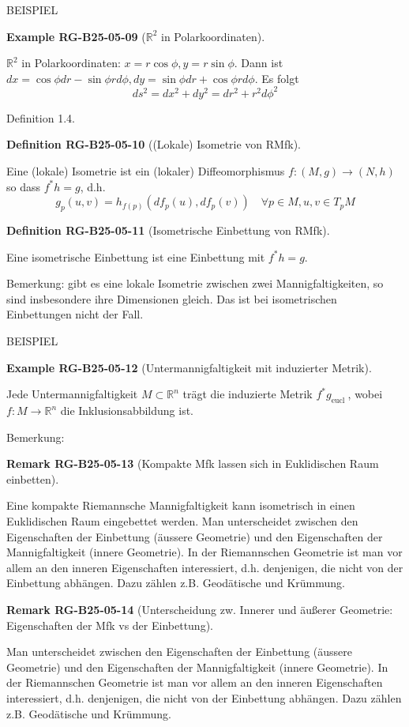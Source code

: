 \documentclass[10pt, letterpaper]{article}
\newcommand{\R}{\mathbb{R}}
\newcommand{\CustomHeading}[3]{%
  \par\medskip\noindent%
  \textbf{#1 #2} \textnormal{(#3)}.\enskip%
}
\newenvironment{DEF}[2]{\begin{unitbox}\CustomHeading{Definition}{#1}{#2}}{\end{unitbox}}
\newenvironment{REM}[2]{\begin{unitbox}\CustomHeading{Remark}{#1}{#2}}{\end{unitbox}}
\newenvironment{EXA}[2]{\begin{unitbox}\CustomHeading{Example}{#1}{#2}}{\end{unitbox}}
\begin{document}
BEISPIEL 


\begin{EXA}{RG-B25-05-09}{$\R^2$ in Polarkoordinaten}
$\mathbb{R}^{2}$ in Polarkoordinaten: $x=r \cos \phi, y=r \sin \phi$. Dann ist $d x=\cos \phi d r-\sin \phi r d \phi, d y=\sin \phi d r+\cos \phi r d \phi$. Es folgt
$$
d s^{2}=d x^{2}+d y^{2}=d r^{2}+r^{2} d \phi^{2}
$$
\end{EXA}

Definition 1.4. 



\begin{DEF}{RG-B25-05-10}{(Lokale) Isometrie von RMfk}
Eine (lokale) Isometrie ist ein (lokaler) Diffeomorphismus $f:(M, g) \rightarrow(N, h)$ so dass $f^{*} h=g$, d.h.
$$
g_{p}(u, v)=h_{f(p)}\left(d f_{p}(u), d f_{p}(v)\right) \quad \forall p \in M, u, v \in T_{p} M
$$
\end{DEF}

\begin{DEF}{RG-B25-05-11}{Isometrische Einbettung von RMfk}
Eine isometrische Einbettung ist eine Einbettung mit $f^{*} h=g$.
\end{DEF}


Bemerkung: gibt es eine lokale Isometrie zwischen zwei Mannigfaltigkeiten, so sind insbesondere ihre Dimensionen gleich. Das ist bei isometrischen Einbettungen nicht der Fall.

BEISPIEL 

\begin{EXA}{RG-B25-05-12}{Untermannigfaltigkeit mit induzierter Metrik}
Jede Untermannigfaltigkeit $M \subset \mathbb{R}^{n}$ trägt die induzierte Metrik $f^{*} g_{\text {eucl }}$, wobei $f: M \rightarrow \mathbb{R}^{n}$ die Inklusionsabbildung ist.
\end{EXA}

Bemerkung: 

\begin{REM}{RG-B25-05-13}{Kompakte Mfk lassen sich in Euklidischen Raum einbetten}
Eine kompakte Riemannsche Mannigfaltigkeit kann isometrisch in einen Euklidischen Raum eingebettet werden. Man unterscheidet zwischen den Eigenschaften der Einbettung (äussere Geometrie) und den Eigenschaften der Mannigfaltigkeit (innere Geometrie). In der Riemannschen Geometrie ist man vor allem an den inneren Eigenschaften interessiert, d.h. denjenigen, die nicht von der Einbettung abhängen. Dazu zählen z.B. Geodätische und Krümmung.
\end{REM}


\begin{REM}{RG-B25-05-14}{Unterscheidung zw. Innerer und äußerer Geometrie: Eigenschaften der Mfk vs der Einbettung}
Man unterscheidet zwischen den Eigenschaften der Einbettung (äussere Geometrie) und den Eigenschaften der Mannigfaltigkeit (innere Geometrie). In der Riemannschen Geometrie ist man vor allem an den inneren Eigenschaften interessiert, d.h. denjenigen, die nicht von der Einbettung abhängen. Dazu zählen z.B. Geodätische und Krümmung.
\end{REM}
\end{document}
